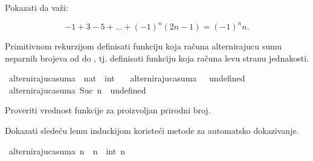 %
\begin{isabellebody}%
%
%
\isadelimtheory
%
\endisadelimtheory
%
\isatagtheory
%
\endisatagtheory
{\isafoldtheory}%
%
\isadelimtheory
%
\endisadelimtheory
%
\begin{exercise}[subtitle=Alternirajuća suma neparnih prirodnih brojeva]
%
\begin{isamarkuptext}%
Pokazati da važi:%
\end{isamarkuptext}\isamarkuptrue%
%
$$ - 1 + 3 - 5 + \ldots + (- 1)^n (2n - 1) = (- 1)^n n.$$
%
\begin{isamarkuptext}%
Primitivnom rekurzijom definisati funkciju  
      koja računa alternirajucu sumu neparnih brojeva od  do , 
      tj. definisati funkciju koja računa levu stranu jednakosti.%
\end{isamarkuptext}\isamarkuptrue%
\isamarkupfalse%
\ alternirajuca{\isacharunderscore}{\kern0pt}suma\ {\isacharcolon}{\kern0pt}{\isacharcolon}{\kern0pt}\ {\isachardoublequoteopen}nat\ {\isasymRightarrow}\ int{\isachardoublequoteclose}\ \isanewline
\ \ {\isachardoublequoteopen}alternirajuca{\isacharunderscore}{\kern0pt}suma\ {}\ {\isacharequal}{\kern0pt}\ undefined{\isachardoublequoteclose}\isanewline
{\isacharbar}{\kern0pt}\ {\isachardoublequoteopen}alternirajuca{\isacharunderscore}{\kern0pt}suma\ {\isacharparenleft}{\kern0pt}Suc\ n{\isacharparenright}{\kern0pt}\ {\isacharequal}{\kern0pt}\ undefined{\isachardoublequoteclose}%
\begin{isamarkuptext}%
Proveriti vrednost funkcije  za proizvoljan prirodni broj.%
\end{isamarkuptext}\isamarkuptrue%
%
\begin{isamarkuptext}%
Dokazati sledeću lemu induckijom koristeći metode za automatsko dokazivanje.%
\end{isamarkuptext}\isamarkuptrue%
\isamarkupfalse%
\ {\isachardoublequoteopen}alternirajuca{\isacharunderscore}{\kern0pt}suma\ n\ {\isacharequal}{\kern0pt}\ {\isacharparenleft}{\kern0pt}{\isacharminus}{\kern0pt}{}{\isacharparenright}{\kern0pt}{\isacharcircum}{\kern0pt}n\ {\isacharasterisk}{\kern0pt}\ int\ n{\isachardoublequoteclose}%

\end{exercise}
\end{isabellebody}
